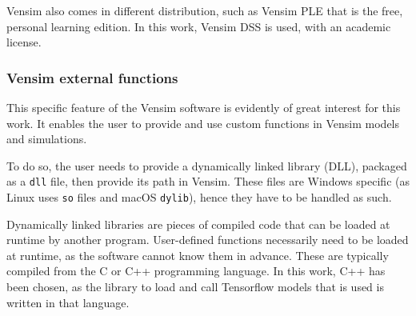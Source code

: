 Vensim also comes in different distribution, such as Vensim PLE that is the free, personal learning edition. In this work, Vensim DSS is used, with an academic license.



\subsubsection{Vensim external functions}

This specific feature of the Vensim software is evidently of great interest for this work. It enables the user to provide and use custom functions in Vensim models and simulations.

To do so, the user needs to provide a dynamically linked library (DLL), packaged as a \texttt{dll} file, then provide its path in Vensim. These files are Windows specific (as Linux uses \texttt{so} files and macOS \texttt{dylib}), hence they have to be handled as such.

Dynamically linked libraries are pieces of compiled code that can be loaded at runtime by another program. User-defined functions necessarily need to be loaded at runtime, as the software cannot know them in advance. These are typically compiled from the C or C++ programming language. In this work, C++ has been chosen, as the library to load and call Tensorflow models that is used is written in that language.

